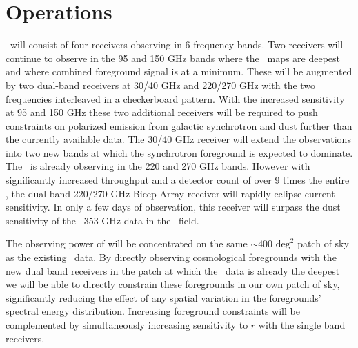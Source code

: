 \documentclass[]{spie}  %
\begin{document}
\section{Operations}

\biceparray \ will consist of four receivers observing in 6 frequency bands.
Two receivers will continue to observe in the 95 and 150 GHz bands where the
\bk \ maps are deepest and where combined foreground
signal is at a minimum. These will be augmented by two dual-band receivers at
30/40 GHz and 220/270 GHz with the two frequencies interleaved in a
checkerboard pattern. With the increased sensitivity at 95 and 150 GHz these
two additional receivers will be required to push constraints on polarized
emission from galactic synchrotron and dust further than the currently available data.
The 30/40 GHz receiver will extend the observations into two
new bands at which the synchrotron foreground is expected to dominate. The
\keckarray \ is already observing in the 220 and 270 GHz bands.  However with
significantly increased throughput and a detector count of over 9 times the
entire \keckarray , the dual band 220/270 GHz Bicep Array receiver will rapidly
eclipse current sensitivity. In only a few days of observation,
this receiver will surpass the dust sensitivity of the \planck \ 353 GHz data in
the \bk \ field. 

The observing power of \biceparray will be concentrated on the same $\sim400
\text{ deg}^2$ patch of sky as the existing \bk \ data. By directly
observing cosmological foregrounds with the new dual band receivers in the
patch at which the \bk \ data is already the deepest we will be able to
directly constrain these foregrounds in our own patch of sky, significantly
reducing the effect of any spatial variation in the foregrounds' spectral
energy distribution. Increasing foreground constraints will be complemented by
simultaneously increasing sensitivity to $r$ with the single band receivers. 





\end{document}
